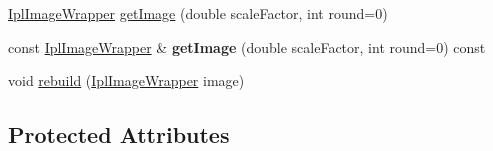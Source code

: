 \begin{DoxyCompactItemize}
\item 
\hyperlink{class_ipl_image_wrapper}{IplImageWrapper} \hyperlink{class_ipl_image_pyramid_a73af0a82dfdca6eaa25a75b3c73996a3}{getImage} (double scaleFactor, int round=0)
\item 
\hypertarget{class_ipl_image_pyramid_a639bc15e51e6a7b55194eb800915cd52}{
const \hyperlink{class_ipl_image_wrapper}{IplImageWrapper} \& {\bfseries getImage} (double scaleFactor, int round=0) const }
\label{class_ipl_image_pyramid_a639bc15e51e6a7b55194eb800915cd52}

\item 
void \hyperlink{class_ipl_image_pyramid_a24f697b2da922a8240aa9f24af476d5e}{rebuild} (\hyperlink{class_ipl_image_wrapper}{IplImageWrapper} image)
\end{DoxyCompactItemize}
\subsection*{Protected Attributes}

